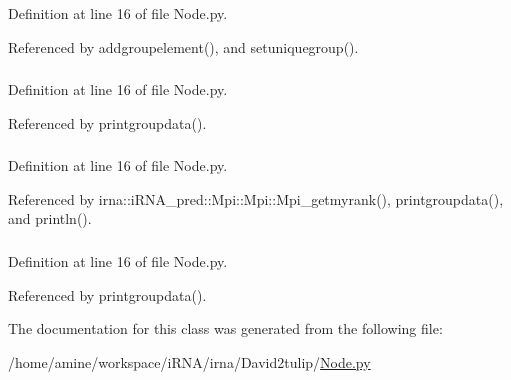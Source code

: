 \-Definition at line 16 of file \-Node.\-py.



\-Referenced by addgroupelement(), and setuniquegroup().

\hypertarget{classirna_1_1David2tulip_1_1Node_1_1Node_ad68b2c9040c68853279ef9d8652ab642}{
\subsubsection[{length}]{}}
\label{classirna_1_1David2tulip_1_1Node_1_1Node_ad68b2c9040c68853279ef9d8652ab642}


\-Definition at line 16 of file \-Node.\-py.



\-Referenced by printgroupdata().

\hypertarget{classirna_1_1David2tulip_1_1Node_1_1Node_ab8456836e2a0d04368f591830d9aebff}{
\subsubsection[{name}]{}}
\label{classirna_1_1David2tulip_1_1Node_1_1Node_ab8456836e2a0d04368f591830d9aebff}


\-Definition at line 16 of file \-Node.\-py.



\-Referenced by irna\-::i\-R\-N\-A\-\_\-pred\-::\-Mpi\-::\-Mpi\-::\-Mpi\-\_\-getmyrank(), printgroupdata(), and println().

\hypertarget{classirna_1_1David2tulip_1_1Node_1_1Node_a5f60cc1a754988bff4f39475d8e035ee}{
\subsubsection[{num}]{}}
\label{classirna_1_1David2tulip_1_1Node_1_1Node_a5f60cc1a754988bff4f39475d8e035ee}


\-Definition at line 16 of file \-Node.\-py.



\-Referenced by printgroupdata().



\-The documentation for this class was generated from the following file\-:\begin{DoxyCompactItemize}
\item 
/home/amine/workspace/i\-R\-N\-A/irna/\-David2tulip/\hyperlink{Node_8py}{\-Node.\-py}\end{DoxyCompactItemize}
